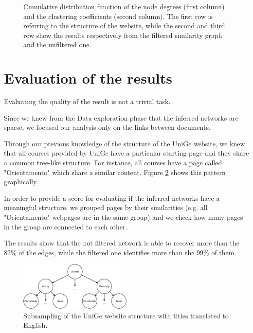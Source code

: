 \begin{figure}[ht]
    \caption{Cumulative distribution function of the node degrees (first column) 
    and the clustering coefficients (second column).
    The first row is referring to the structure of the website, while
    the second and third row show the results respectively from the filtered similarity graph and the unfiltered one.}
    \label{fig:exploration}
\end{figure}



\section{Evaluation of the results} \label{eval}

Evaluating the quality of the result is not a trivial task. 

Since we knew from the Data exploration phase that the inferred networks are sparse, 
we focused our analysis only on the links between documents. 

Through our previous knowledge of the structure of the UniGe website, we knew that 
all courses provided by UniGe have a particular starting page and 
they share a common tree-like structure. 
For instance, all courses have a page called "Orientamento" which share a similar content. 
Figure \ref{fig:unige-structure} shows this pattern graphically.

In order to provide a score for evaluating if the inferred networks have a meaningful structure, 
we grouped pages by their similarities (e.g. all "Orientamento" webpages are in the same group) and 
we check how many pages in the group are connected to each other. 

The results show that the not filtered network is able to recover more than the 82\% of the edges, 
while the filtered one identifies more than the 99\% of them. 

\begin{figure}[H]
    \centering
    \includegraphics[width=0.5\textwidth]{images/unige-structure.eps}
    \caption{Subsampling of the UniGe website structure with titles translated to English.}
    \label{fig:unige-structure}
\end{figure}

